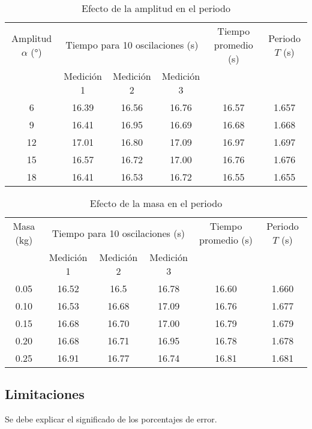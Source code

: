\documentclass[twocolumn]{article}
\numberwithin{table}{section}
\begin{document}
\begin{table}[ht]
  \centering
  \caption{Efecto de la amplitud en el periodo}\label{tab:amplitud_periodo}
  \begin{tabular}{cccccc}
    \toprule
    Amplitud $\alpha$ (°) & \multicolumn{3}{c}{Tiempo para 10
    oscilaciones (s)} & Tiempo promedio (s) & Periodo $T$ (s) \\
    \cmidrule(lr){2-4}
    & Medición 1 & Medición 2 & Medición 3 &  &  \\
    \midrule
    6   & 16.39 & 16.56 & 16.76 & 16.57 & 1.657 \\
    9   & 16.41 & 16.95 & 16.69 & 16.68 & 1.668 \\
    12  & 17.01 & 16.80 & 17.09 & 16.97 & 1.697 \\
    15  & 16.57 & 16.72 & 17.00 & 16.76 & 1.676 \\
    18  & 16.41 & 16.53 & 16.72 & 16.55 & 1.655 \\
    \bottomrule
  \end{tabular}
\end{table}

\begin{table}[ht]
  \centering
  \caption{Efecto de la masa en el periodo}\label{tab:masa_periodo}
  \begin{tabular}{cccccc}
    \toprule
    Masa (kg) & \multicolumn{3}{c}{Tiempo para 10 oscilaciones
    (s)} & Tiempo promedio (s) & Periodo $T$ (s) \\
    \cmidrule(lr){2-4}
    & Medición 1 & Medición 2 & Medición 3 &  &  \\
    \midrule
    0.05  & 16.52 & 16.5  & 16.78 & 16.60 & 1.660 \\
    0.10  & 16.53 & 16.68 & 17.09 & 16.76 & 1.677 \\
    0.15  & 16.68 & 16.70 & 17.00 & 16.79 & 1.679 \\
    0.20  & 16.68 & 16.71 & 16.95 & 16.78 & 1.678 \\
    0.25  & 16.91 & 16.77 & 16.74 & 16.81 & 1.681 \\
    \bottomrule
  \end{tabular}
\end{table}

\twocolumn

\subsection{Limitaciones}

\textcolor{workblue}{Se debe explicar el significado de los porcentajes de
error.}
\end{document}
